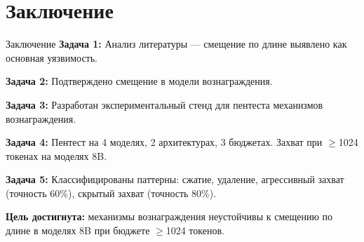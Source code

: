 \section{Заключение}
\begin{frame}{Заключение}
    \small
    \textbf{Задача 1:} Анализ литературы --- смещение по длине 
    выявлено как основная уязвимость.
    
    \vspace{0.15cm}
    \textbf{Задача 2:} Подтверждено смещение в модели 
    вознаграждения.
    
    \vspace{0.15cm}
    \textbf{Задача 3:} Разработан экспериментальный стенд 
    для пентеста механизмов вознаграждения.
    
    \vspace{0.15cm}
    \textbf{Задача 4:} Пентест на 4 моделях, 2 архитектурах, 
    3 бюджетах. Захват при $\geq$1024 токенах на моделях 8B.
    
    \vspace{0.15cm}
    \textbf{Задача 5:} Классифицированы паттерны: 
    сжатие, удаление, агрессивный захват (точность 60\%), 
    скрытый захват (точность 80\%).
    
    \vspace{0.3cm}
    \textbf{Цель достигнута:} механизмы вознаграждения неустойчивы 
    к смещению по длине в моделях 8B при бюджете $\geq$1024 токенов.
\end{frame}

